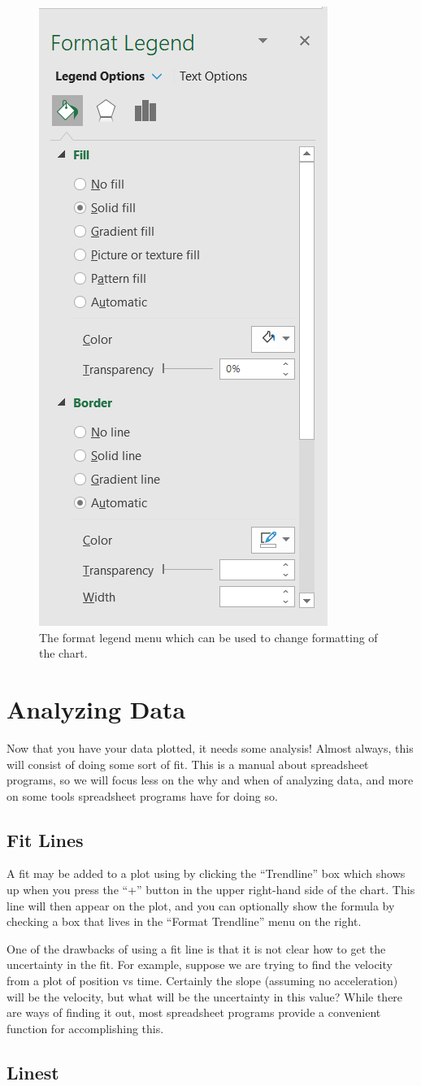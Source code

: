 \documentclass[10pt]{article}
\begin{document}
\begin{figure}[htpb]
	\centering
	\includegraphics[width=0.2\linewidth]{images/format-legend.png}
	\caption{The format legend menu which can be used to change formatting of the chart.}%
	\label{fig:images_format-legend}
\end{figure}


\section{Analyzing Data}%
\label{sec:analyzing_data}

Now that you have your data plotted, it needs some analysis! Almost always, this will consist of doing some sort of fit. This is a manual about spreadsheet programs, so we will focus less on the why and when of analyzing data, and more on some tools spreadsheet programs have for doing so. 

\subsection{Fit Lines}%
\label{sub:fit_lines}

A fit may be added to a plot using by clicking the ``Trendline'' box which shows up when you press the ``+'' button in the upper right-hand side of the chart. This line will then appear on the plot, and you can optionally show the formula by checking a box that lives in the ``Format Trendline'' menu on the right. 

One of the drawbacks of using a fit line is that it is not clear how to get the uncertainty in the fit. For example, suppose we are trying to find the velocity from a plot of position vs time. Certainly the slope (assuming no acceleration) will be the velocity, but what will be the uncertainty in this value? While there are ways of finding it out, most spreadsheet programs provide a convenient function for accomplishing this.

\subsection{Linest}%
\label{sub:linest}
\end{document}
